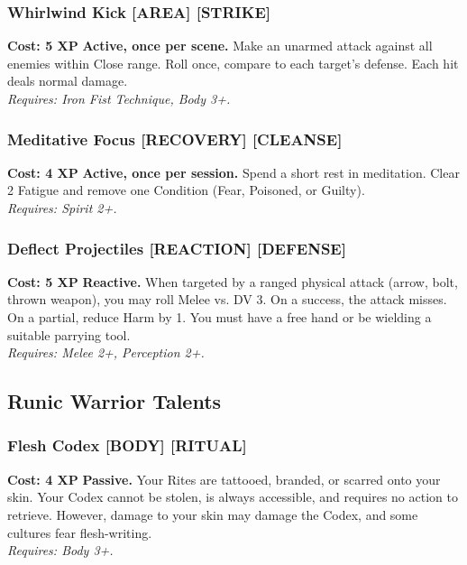 \documentclass[12pt,a4paper]{book}
\begin{document}
\subsubsection*{Whirlwind Kick \textnormal{[AREA] [STRIKE]}}
\label{talent:whirlwind-kick}
\textbf{Cost: 5 XP} \textbf{Active, once per scene.} Make an unarmed attack against all enemies within Close range. Roll once, compare to each target's defense. Each hit deals normal damage. \\
\textit{Requires: Iron Fist Technique, Body 3+.}

\subsubsection*{Meditative Focus \textnormal{[RECOVERY] [CLEANSE]}}
\label{talent:meditative-focus}
\textbf{Cost: 4 XP} \textbf{Active, once per session.} Spend a short rest in meditation. Clear 2 Fatigue and remove one Condition (Fear, Poisoned, or Guilty). \\
\textit{Requires: Spirit 2+.}

\subsubsection*{Deflect Projectiles \textnormal{[REACTION] [DEFENSE]}}
\label{talent:deflect-projectiles}
\textbf{Cost: 5 XP} \textbf{Reactive.} When targeted by a ranged physical attack (arrow, bolt, thrown weapon), you may roll Melee vs. DV 3. On a success, the attack misses. On a partial, reduce Harm by 1. You must have a free hand or be wielding a suitable parrying tool. \\
\textit{Requires: Melee 2+, Perception 2+.}

\subsection*{Runic Warrior Talents}
\label{sec:major-runic-warrior}

\subsubsection*{Flesh Codex \textnormal{[BODY] [RITUAL]}}
\label{talent:flesh-codex}
\textbf{Cost: 4 XP} \textbf{Passive.} Your Rites are tattooed, branded, or scarred onto your skin. Your Codex cannot be stolen, is always accessible, and requires no action to retrieve. However, damage to your skin may damage the Codex, and some cultures fear flesh-writing. \\
\textit{Requires: Body 3+.}
\end{document}
